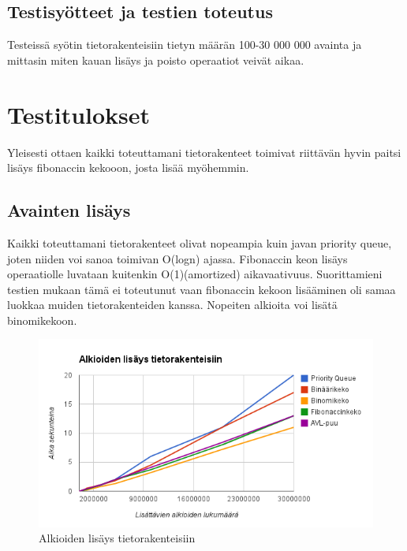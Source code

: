 \documentclass[11pt,a4paper]{article}
\begin{document}
\subsection{Testisyötteet ja testien toteutus}
Testeissä syötin tietorakenteisiin tietyn määrän 100-30 000 000 avainta ja mittasin miten kauan lisäys ja poisto operaatiot veivät aikaa.
\section{Testitulokset}
Yleisesti ottaen kaikki toteuttamani tietorakenteet toimivat riittävän hyvin paitsi lisäys fibonaccin kekooon, josta lisää myöhemmin.
\subsection{Avainten lisäys}
Kaikki toteuttamani tietorakenteet olivat nopeampia kuin javan priority queue, joten niiden voi sanoa toimivan O(logn) ajassa. Fibonaccin keon lisäys operaatiolle luvataan kuitenkin O(1)(amortized) aikavaativuus. Suorittamieni testien mukaan tämä ei toteutunut vaan fibonaccin kekoon lisääminen oli samaa luokkaa muiden tietorakenteiden kanssa. Nopeiten alkioita voi lisätä binomikekoon.
\begin{figure}[h]
\centering
\includegraphics[scale=0.7]{alkioidenlisays.png}
\caption{Alkioiden lisäys tietorakenteisiin}
\end{figure}
\end{document}
